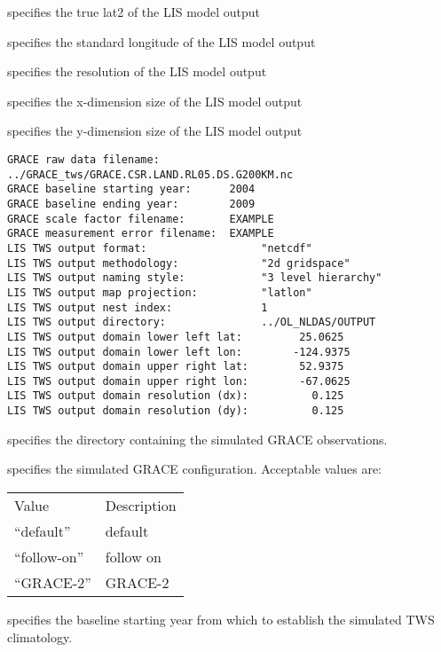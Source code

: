  specifies the true lat2 of the LIS model output

 specifies the standard longitude of the LIS model output

 specifies the resolution of the LIS model output

 specifies the x-dimension size of the LIS model output

 specifies the y-dimension size of the LIS model output

 

 \begin{Verbatim}[frame=single]
GRACE raw data filename:    ../GRACE_tws/GRACE.CSR.LAND.RL05.DS.G200KM.nc
GRACE baseline starting year:      2004
GRACE baseline ending year:        2009
GRACE scale factor filename:       EXAMPLE
GRACE measurement error filename:  EXAMPLE
LIS TWS output format:                  "netcdf"
LIS TWS output methodology:             "2d gridspace"
LIS TWS output naming style:            "3 level hierarchy"
LIS TWS output map projection:          "latlon"
LIS TWS output nest index:              1
LIS TWS output directory:               ../OL_NLDAS/OUTPUT
LIS TWS output domain lower left lat:         25.0625
LIS TWS output domain lower left lon:        -124.9375
LIS TWS output domain upper right lat:        52.9375
LIS TWS output domain upper right lon:        -67.0625
LIS TWS output domain resolution (dx):          0.125
LIS TWS output domain resolution (dy):          0.125
 \end{Verbatim}

 
  specifies the directory
 containing the simulated GRACE observations.

  specifies the simulated GRACE
 configuration.
 Acceptable values are:

 \begin{tabular}{ll}
 Value         & Description \\
 ``default''   & default     \\
 ``follow-on'' & follow on   \\
 ``GRACE-2''   & GRACE-2     \\
 \end{tabular}

 specifies the baseline starting year from which to establish the 
 simulated TWS climatology.

